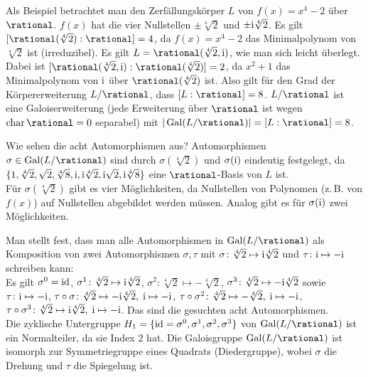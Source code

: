 \begin{Bsp}
    Als Beispiel betrachtet man den Zerfällungskörper $L$ von
    $f(x) = x^4 - 2$ über $\rational$.
    $f(x)$ hat die vier Nullstellen
    $\pm\sqrt[4]{2}$ und $\pm\text{i}\sqrt[4]{2}$.
    Es gilt $[\rational(\sqrt[4]{2}):\rational] = 4$, da
    $f(x) = x^4 - 2$ das Minimalpolynom von $\sqrt[4]{2}$ ist (irreduzibel).
    Es gilt $L = \rational(\sqrt[4]{2}, \i)$, wie man sich leicht überlegt.
    Dabei ist $[\rational(\sqrt[4]{2}, \i):\rational(\sqrt[4]{2})] = 2$,
    da $x^2 + 1$ das Minimalpolynom von $\text{i}$ über $\rational(\sqrt[4]{2})$ ist.
    Also gilt für den Grad der Körpererweiterung $L/\rational$, dass
    $[L:\rational] = 8$.
    $L/\rational$ ist eine Galoiserweiterung
    (jede Erweiterung über $\rational$ ist wegen $\Char \rational = 0$
    separabel) mit
    $|\Gal(L/\rational)| = [L:\rational] = 8$.
    
    Wie sehen die acht Automorphismen aus?
    Automorphismen $\sigma \in \Gal(L/\rational)$ sind durch
    $\sigma(\sqrt[4]{2})$ und $\sigma(\text{i})$ eindeutig festgelegt, da
    $\{1, \sqrt[4]{2}, \sqrt{2}, \sqrt[4]{8},
    \text{i}, \text{i}\sqrt[4]{2}, \text{i}\sqrt{2}, \text{i}\sqrt[4]{8}\}$
    eine $\rational$-Basis von $L$ ist.\\
    Für $\sigma(\sqrt[4]{2})$ gibt es vier Möglichkeiten,
    da Nullstellen von Polynomen (z.\,B. von $f(x)$) auf Nullstellen
    abgebildet werden müssen.
    Analog gibt es für $\sigma(\text{i})$ zwei Möglichkeiten.
    
    Man stellt fest, dass man alle Automorphismen in $\Gal(L/\rational)$
    als Komposition von zwei Automorphismen $\sigma, \tau$ mit
    $\sigma\colon \sqrt[4]{2} \mapsto \text{i}\sqrt[4]{2}$ und
    $\tau\colon \text{i} \mapsto -\text{i}$ schreiben kann:\\
    Es gilt $\sigma^0 = \operatorname{id}$,\qquad
    $\sigma^1\colon \sqrt[4]{2} \mapsto \text{i}\sqrt[4]{2}$,\qquad
    $\sigma^2\colon \sqrt[4]{2} \mapsto -\sqrt[4]{2}$,\qquad
    $\sigma^3\colon \sqrt[4]{2} \mapsto -\text{i}\sqrt[4]{2}$ sowie\\
    $\tau\colon \text{i} \mapsto -\text{i}$,\qquad
    $\tau \circ \sigma\colon \sqrt[4]{2} \mapsto -\text{i}\sqrt[4]{2},\;
    \text{i} \mapsto -\text{i}$,\qquad
    $\tau \circ \sigma^2\colon \sqrt[4]{2} \mapsto -\sqrt[4]{2},\;
    \text{i} \mapsto -\text{i}$,\\
    $\tau \circ \sigma^3\colon \sqrt[4]{2} \mapsto \text{i}\sqrt[4]{2},\;
    \text{i} \mapsto -\text{i}$.
    Das sind die gesuchten acht Automorphismen.\\
    Die zyklische Untergruppe
    $H_1 = \{\operatorname{id} = \sigma^0, \sigma^1, \sigma^2, \sigma^3\}$ von
    $\Gal(L/\rational)$ ist ein Normalteiler, da sie Index $2$ hat.
    Die Galoisgruppe $\Gal(L/\rational)$ ist isomorph zur
    Symmetriegruppe eines Quadrats (Diedergruppe),
    wobei $\sigma$ die Drehung und $\tau$ die Spiegelung ist.
    

\end{Bsp}
